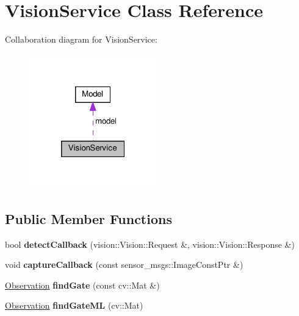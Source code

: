 \hypertarget{classVisionService}{}\section{Vision\+Service Class Reference}
\label{classVisionService}


Collaboration diagram for Vision\+Service\+:\nopagebreak
\begin{figure}[H]
\begin{center}
\leavevmode
\includegraphics[width=157pt]{classVisionService__coll__graph}
\end{center}
\end{figure}
\subsection*{Public Member Functions}
\begin{DoxyCompactItemize}
\item 
\mbox{\label{classVisionService_a40b83115dc945cfa9ed16fdfa3c99ba5}} 
bool {\bfseries detect\+Callback} (vision\+::\+Vision\+::\+Request \&, vision\+::\+Vision\+::\+Response \&)
\item 
\mbox{\label{classVisionService_a02a14fd32cf867b31c7d711a7b64691f}} 
void {\bfseries capture\+Callback} (const sensor\+\_\+msgs\+::\+Image\+Const\+Ptr \&)
\item 
\mbox{\label{classVisionService_a1395f4513469c69074c2f7e16da68c13}} 
\hyperlink{structObservation}{Observation} {\bfseries find\+Gate} (const cv\+::\+Mat \&)
\item 
\mbox{\label{classVisionService_aa294fde48d52b528ca2082910f7cce2f}} 
\hyperlink{structObservation}{Observation} {\bfseries find\+Gate\+ML} (cv\+::\+Mat)
\end{DoxyCompactItemize}
